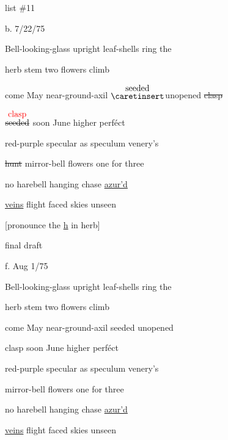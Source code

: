 \documentclass[a4paper]{article}
\begin{document}
\color{red}
\begin{minipage}{1cm}
\Circled{\color{blue}{13}} 
\end{minipage}
\begin{minipage}{7cm}
\color{blue}
list \#11 \hfill {}\par
\color{red}
b. 7/22/75 \hfill \Circled{\color{blue}{Venus's Looking-glass}}\par
\end{minipage}

\color{blue}



\begin{linenumbers} \draft
Bell-looking-glass upright leaf-shells ring the\par
herb \color{red}\textsuperscript{\Circled{$\ast$}} \color{blue} stem two flowers climb\par
come May near-ground-axil \color{red} $\stackrel{\hbox{seeded}}{\hbox{$\caretinsert$}}$\color{blue}unopened \st{clasp}\par
$\stackrel{\hbox{\color{red}{clasp}}}{\hbox{\st{seeded}}}$ soon June higher perf\'ect\par
red-purple specular as speculum venery's\par
\st{hunt} mirror-bell flowers one for three\par
no harebell hanging chase \ul{azur'd}\par
\ul{veins} flight faced skies unseen
\end{linenumbers}
\color{red}
[\textsuperscript{\Circled{$\ast$}}pronounce the \ul{h} in herb]
\par
{}
final draft\par
f. Aug 1/75\par

\color{blue}
\begin{linenumbers}
\draft
Bell-looking-glass upright leaf-shells ring the\par
herb stem two flowers climb\par
come May near-ground-axil seeded unopened\par
clasp soon June higher perf\'ect\par
red-purple specular as speculum venery's\par
mirror-bell flowers one for three\par
no harebell hanging chase \ul{azur'd}\par
\ul{veins} flight faced skies unseen
\end{linenumbers}
\end{document}
